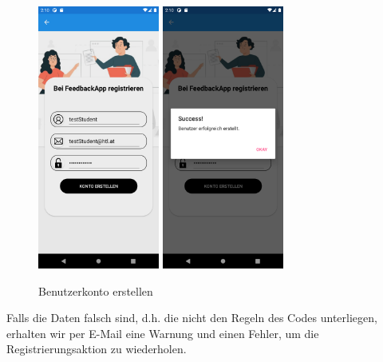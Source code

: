 \begin{figure}[h]
    \begin{center}
        \includegraphics[width=4cm]{pics/Xamarin Student/3 Registration Page Full.png}\hfill
        \includegraphics[width=4cm]{pics/Xamarin Student/4 Registration Page Success.png}
        \caption[Registrierung Ansicht]{Benutzerkonto erstellen}
    \end{center}
\end{figure}
Falls die Daten falsch sind, d.h. die nicht den Regeln des Codes unterliegen, erhalten wir per E-Mail eine Warnung und einen Fehler, um die Registrierungsaktion zu wiederholen.
\newpage

